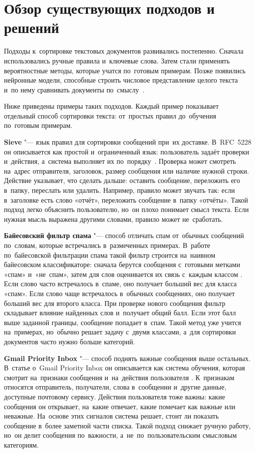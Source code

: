 \section{Обзор существующих подходов и решений}\label{sec:ch1/systems}

Подходы к~сортировке текстовых документов развивались постепенно. Сначала
использовались ручные правила и~ключевые слова. Затем стали применять
вероятностные методы, которые учатся по~готовым примерам. Позже появились
нейронные модели, способные строить числовое представление целого текста и~по
нему сравнивать документы по~смыслу~\autocite{Sebastiani2002TextCat,Kowsari2019TextSurvey}.

Ниже приведены примеры таких подходов. Каждый пример показывает отдельный
способ сортировки текста: от~простых правил до~обучения по~готовым примерам.

\textbf{Sieve} "--- язык правил для сортировки сообщений при~их доставке.
В~RFC~5228 он описывается как простой и~ограниченный язык: пользователь задаёт
проверки и~действия, а~система выполняет их по~порядку~\autocite{Guenther2008Sieve}.
Проверка может смотреть на~адрес отправителя, заголовок, размер сообщения или
наличие нужной строки. Действие указывает, что сделать дальше: оставить
сообщение, переложить его в~папку, переслать или удалить. Например, правило
может звучать так: если в~заголовке есть слово «отчёт», переложить сообщение
в~папку «отчёты». Такой подход легко объяснить пользователю, но~он плохо
понимает смысл текста. Если нужная мысль выражена другими словами, правило
может не~сработать.

\textbf{Байесовский фильтр спама} "--- способ отличать спам от~обычных
сообщений по~словам, которые встречались в~размеченных примерах. В~работе
по~байесовской фильтрации спама такой фильтр строится на~наивном
байесовском классификаторе: сначала берутся сообщения с~готовыми метками
«спам» и~«не~спам», затем для слов оценивается их связь с~каждым классом
\autocite{Androutsopoulos2000NaiveBayesSpam}. Если слово часто встречалось
в~спаме, оно получает больший вес для класса «спам». Если слово чаще
встречалось в~обычных сообщениях, оно получает больший вес для второго класса.
При проверке нового сообщения фильтр складывает влияние найденных слов
и~получает общий балл. Если этот балл выше заданной границы, сообщение
попадает в~спам. Такой метод уже учится на~примерах, но~обычно решает задачу
с~двумя классами, а~для сортировки документов часто нужно больше категорий.

\textbf{Gmail Priority Inbox} "--- способ поднять важные сообщения выше
остальных. В~статье о~Gmail Priority Inbox он описывается как система
обучения, которая смотрит на~признаки сообщения и~на~действия пользователя
\autocite{Aberdeen2010PriorityInbox}.
К~признакам относятся отправитель, получатели, слова в~сообщении и~другие
данные, доступные почтовому сервису. Действия пользователя тоже важны: какие
сообщения он открывает, на~какие отвечает, какие помечает как важные или
неважные. На~основе этих сигналов система решает, стоит ли показать сообщение
в~более заметной части списка. Такой подход снижает ручную работу, но~он
делит сообщения по~важности, а~не~по~пользовательским смысловым категориям.

